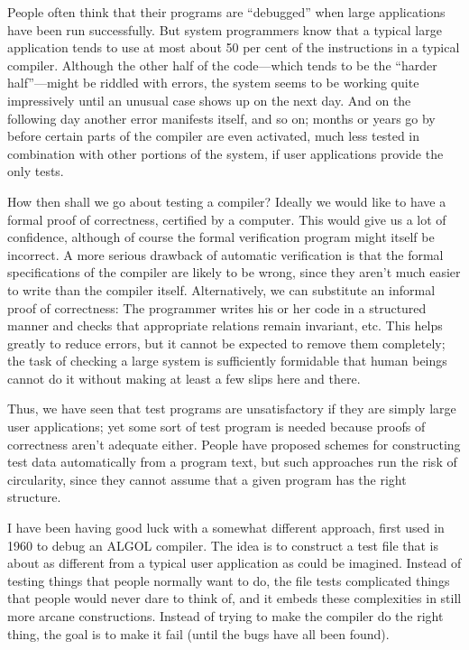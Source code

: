 People often think that their programs are ``debugged'' when large applications
have been run successfully. But system programmers know that a typical large
application tends to use at most about 50 per cent of the instructions
in a typical compiler. Although the other half of the code---which tends
to be the ``harder half''---might be riddled with errors, the system seems
to be working quite impressively until an unusual case shows up on the
next day. And on the following day another error manifests itself, and so on;
months or years go by before certain parts of the compiler are even
activated, much less tested in combination with other portions of the system,
if user applications provide the only tests.

How then shall we go about testing a compiler? Ideally we would like to
have a formal proof of correctness, certified by a computer.
This would give us a lot of confidence,
although of course the formal verification program might itself be incorrect.
A more serious drawback of automatic verification is that the formal
specifications of the compiler are likely to be wrong, since they aren't
much easier to write than the compiler itself. Alternatively, we can
substitute an informal proof of correctness: The programmer writes his or
her code in a structured manner and checks that appropriate relations
remain invariant, etc. This helps greatly to reduce errors, but it cannot
be expected to remove them completely; the task of checking a large
system is sufficiently formidable that human beings cannot do it without
making at least a few slips here and there.

Thus, we have seen that test programs are unsatisfactory if they are simply
large user applications; yet some sort of test program is needed because
proofs of correctness aren't adequate either. People have proposed schemes
for constructing test data automatically from a program text, but such
approaches run the risk of circularity, since they cannot assume that a
given program has the right structure.

I have been having good luck with a somewhat different approach,
first used in 1960 to debug an {\mc ALGOL} compiler. The idea is to
construct a test file that is about as different from a typical user
application as could be imagined. Instead of testing things that people
normally want to do, the file tests complicated things that people would
never dare to think of, and it embeds these complexities in still
more arcane constructions. Instead of trying to make the compiler do the
right thing, the goal is to make it fail (until the bugs have all been found).

